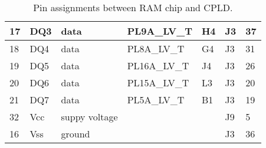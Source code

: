 \documentclass{article}
\begin{document}
\begin{table}
\begin{tabular}{|l|l|l|l|l|l|l|}
	\hline
	17 & DQ3 & data & PL9A\_LV\_T & H4 & J3 & 37 \\
	\hline
	18 & DQ4 & data & PL8A\_LV\_T & G4 & J3 & 31 \\
	\hline
	19 & DQ5 & data & PL16A\_LV\_T & J4 & J3 & 26 \\
	\hline
	20 & DQ6 & data & PL15A\_LV\_T & L3 & J3 & 20 \\
	\hline
	21 & DQ7 & data & PL5A\_LV\_T & B1 & J3 & 19 \\
	\hline
	32 & Vcc & suppy voltage & & & J9 & 5 \\
	\hline
	16 & Vss & ground & & & J3 & 36 \\
	\hline
\end{tabular}
\caption{Pin assignments between RAM chip and CPLD.}
\end{table}
\end{document}
